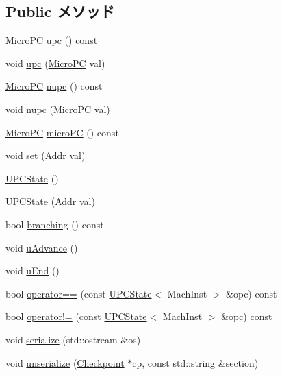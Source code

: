 \subsection*{Public メソッド}
\begin{DoxyCompactItemize}
\item 
\hyperlink{base_2types_8hh_adfb4d8b20c5abc8be73dd367b16f2d57}{MicroPC} \hyperlink{classGenericISA_1_1UPCState_a58857cf73ead03fe3a2e9ca79587f326}{upc} () const 
\item 
void \hyperlink{classGenericISA_1_1UPCState_ae13f8fb6bc07c4a7ac4af3496277000c}{upc} (\hyperlink{base_2types_8hh_adfb4d8b20c5abc8be73dd367b16f2d57}{MicroPC} val)
\item 
\hyperlink{base_2types_8hh_adfb4d8b20c5abc8be73dd367b16f2d57}{MicroPC} \hyperlink{classGenericISA_1_1UPCState_abc005b6462dcd78d9b0cfd3f0cfe3913}{nupc} () const 
\item 
void \hyperlink{classGenericISA_1_1UPCState_a58db0b2a7462cf953ace57aee78ac338}{nupc} (\hyperlink{base_2types_8hh_adfb4d8b20c5abc8be73dd367b16f2d57}{MicroPC} val)
\item 
\hyperlink{base_2types_8hh_adfb4d8b20c5abc8be73dd367b16f2d57}{MicroPC} \hyperlink{classGenericISA_1_1UPCState_a8f0ea0df7a63b5fbf898277c4d3a1268}{microPC} () const 
\item 
void \hyperlink{classGenericISA_1_1UPCState_a9a5b900e841dd75dc81970850547918f}{set} (\hyperlink{base_2types_8hh_af1bb03d6a4ee096394a6749f0a169232}{Addr} val)
\item 
\hyperlink{classGenericISA_1_1UPCState_a617a27ae163e68a865b9935f62d5f821}{UPCState} ()
\item 
\hyperlink{classGenericISA_1_1UPCState_ad29f717a0f93dcfb3b6da3854c4bd22d}{UPCState} (\hyperlink{base_2types_8hh_af1bb03d6a4ee096394a6749f0a169232}{Addr} val)
\item 
bool \hyperlink{classGenericISA_1_1UPCState_ae3f0eb15a9382eefff6b00cf7999c2e3}{branching} () const 
\item 
void \hyperlink{classGenericISA_1_1UPCState_a5e17a0358d00a918a1b1b9beeed380d1}{uAdvance} ()
\item 
void \hyperlink{classGenericISA_1_1UPCState_a2f3cdfc88ed61928bd28242996e0f86e}{uEnd} ()
\item 
bool \hyperlink{classGenericISA_1_1UPCState_accc92b38a5f2592fb8bc4a32dcd7355c}{operator==} (const \hyperlink{classGenericISA_1_1UPCState}{UPCState}$<$ MachInst $>$ \&opc) const 
\item 
bool \hyperlink{classGenericISA_1_1UPCState_ac308decf5b5542401a4d52a91f43331b}{operator!=} (const \hyperlink{classGenericISA_1_1UPCState}{UPCState}$<$ MachInst $>$ \&opc) const 
\item 
void \hyperlink{classGenericISA_1_1UPCState_a53e036786d17361be4c7320d39c99b84}{serialize} (std::ostream \&os)
\item 
void \hyperlink{classGenericISA_1_1UPCState_af22e5d6d660b97db37003ac61ac4ee49}{unserialize} (\hyperlink{classCheckpoint}{Checkpoint} $\ast$cp, const std::string \&section)
\end{DoxyCompactItemize}
